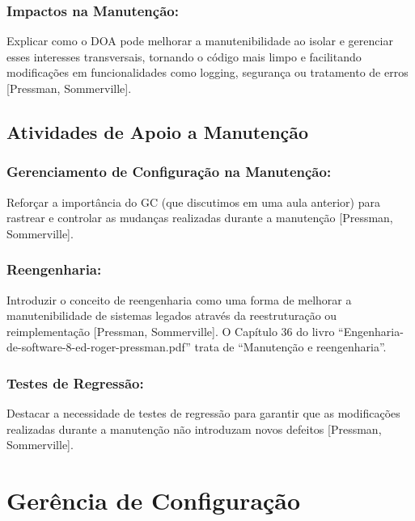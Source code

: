 \documentclass[
]{book}
\begin{document}
\subsection{Impactos na Manutenção:}\label{impactos-na-manutenuxe7uxe3o-1}

Explicar como o DOA pode melhorar a manutenibilidade ao isolar e gerenciar esses interesses transversais, tornando o código mais limpo e facilitando modificações em funcionalidades como logging, segurança ou tratamento de erros {[}Pressman, Sommerville{]}.

\section{Atividades de Apoio a Manutenção}\label{atividades-de-apoio-a-manutenuxe7uxe3o}

\subsection{Gerenciamento de Configuração na Manutenção:}\label{gerenciamento-de-configurauxe7uxe3o-na-manutenuxe7uxe3o}

Reforçar a importância do GC (que discutimos em uma aula anterior) para rastrear e controlar as mudanças realizadas durante a manutenção {[}Pressman, Sommerville{]}.

\subsection{Reengenharia:}\label{reengenharia}

Introduzir o conceito de reengenharia como uma forma de melhorar a manutenibilidade de sistemas legados através da reestruturação ou reimplementação {[}Pressman, Sommerville{]}. O Capítulo 36 do livro ``Engenharia-de-software-8-ed-roger-pressman.pdf'' trata de ``Manutenção e reengenharia''.

\subsection{Testes de Regressão:}\label{testes-de-regressuxe3o}

Destacar a necessidade de testes de regressão para garantir que as modificações realizadas durante a manutenção não introduzam novos defeitos {[}Pressman, Sommerville{]}.

\chapter{Gerência de Configuração}\label{geruxeancia-de-configurauxe7uxe3o}
\end{document}

